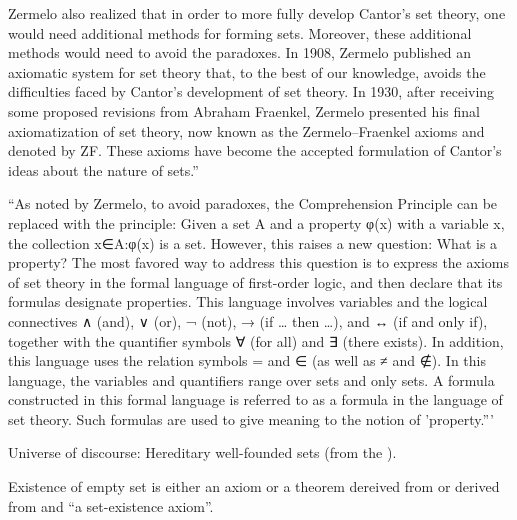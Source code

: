 Zermelo also realized that in order to more fully develop Cantor’s set theory, one would need additional methods for forming sets. Moreover, these additional methods would need to avoid the paradoxes. In 1908, Zermelo published an axiomatic system for set theory that, to the best of our knowledge, avoids the difficulties faced by Cantor’s development of set theory. In 1930, after receiving some proposed revisions from Abraham Fraenkel, Zermelo presented his final axiomatization of set theory, now known as the Zermelo–Fraenkel axioms and denoted by ZF. 
These axioms have become the accepted formulation 
of Cantor’s ideas about the nature of sets.''\cite{iep:Set_theory} 

``As noted by Zermelo, to avoid paradoxes, 
the Comprehension Principle can be replaced with the principle: 
Given a set A and a property φ(x) with a variable x, the 
collection {x∈A:φ(x)} is a set. 
However, this raises a new question: 
What is a property? 
The most favored way to address this question is to express 
the axioms of set theory
in the formal language of first-order logic, 
and then declare that its formulas designate properties. 
This language involves variables and the logical connectives
 ∧ (and), ∨ (or), ¬ (not), → (if … then …), 
 and ↔ (if and only if), 
 together with the quantifier symbols ∀ (for all) 
 and ∃ (there exists). 
 In addition, this language uses the relation symbols
  = and ∈ (as well as ≠ and ∉). 
  In this language, the variables and quantifiers range over sets 
  and only sets. 
  A formula constructed in this formal language is referred to as
   a formula in the language of set theory. Such formulas are used 
   to give meaning to the notion of 
   'property.'''\cite{iep:Set_theory}


Universe of discourse: 
Hereditary well-founded sets 
(from the ).

Existence of empty set is either an 
axiom\cite{wiki:Axiom_of_empty_set}
or a theorem dereived from 
or derived from 
and ``a set-existence axiom''.

